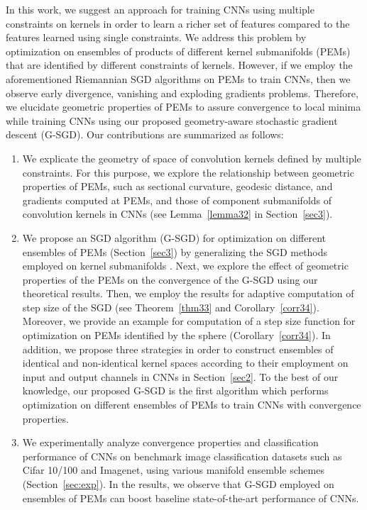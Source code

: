 \documentclass[10pt,journal,compsoc]{IEEEtran}
\theoremstyle{definition}
\theoremstyle{definition}
\theoremstyle{remark}
\theoremstyle{remark}
\theoremstyle{remark}
\begin{document}
In this work, we suggest an approach for training CNNs using multiple constraints on kernels in order to learn a richer set of features compared to the features learned using single constraints. We address this problem by optimization on ensembles of products of different kernel submanifolds (PEMs) that are identified by different constraints of kernels. However, if we employ the aforementioned Riemannian SGD algorithms \cite{sgdman,RBN,oo16} on PEMs to train CNNs, then we observe early divergence, vanishing and exploding gradients problems. Therefore, we elucidate geometric properties of PEMs to assure convergence to local minima while training CNNs using our proposed geometry-aware stochastic gradient descent (G-SGD). Our contributions are summarized as follows:
\begin{enumerate}

\item We explicate the geometry of space of convolution kernels defined by multiple constraints. For this purpose, we explore the relationship between geometric properties of PEMs, such as sectional curvature, geodesic distance, and gradients computed at PEMs, and those of component submanifolds of convolution kernels in CNNs (see Lemma~\ref{lemma32} in Section~\ref{sec3}).  

\item We propose an SGD algorithm (G-SGD) for optimization on different ensembles of PEMs (Section~\ref{sec3}) by generalizing the SGD methods employed on kernel submanifolds \cite{haaai,huang162,oo16}. Next, we explore the effect of geometric properties of the PEMs on the convergence of the G-SGD using our theoretical results. Then, we employ the results for adaptive computation of step size of the SGD (see Theorem~\ref{thm33} and Corollary~\ref{corr34}). Moreover, we provide an example for computation of a step size function for optimization on PEMs identified by the sphere (Corollary~\ref{corr34}). In addition, we propose three strategies in order to construct ensembles of identical and non-identical kernel spaces according to their employment on input and output channels in CNNs in Section~\ref{sec2}. To the best of our knowledge, our proposed G-SGD is the first algorithm which performs optimization on different ensembles of PEMs to train CNNs with convergence properties.


\item We experimentally analyze convergence properties and classification performance of CNNs on benchmark image classification datasets such as Cifar 10/100 and Imagenet, using various manifold ensemble schemes (Section~\ref{sec:exp}). In the results, we observe that G-SGD employed on ensembles of PEMs can boost baseline state-of-the-art performance of CNNs.  
\end{enumerate}
\end{document}
